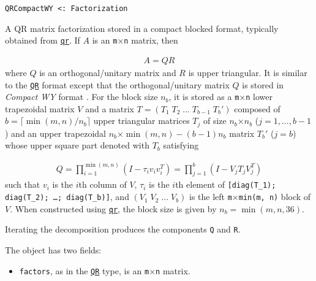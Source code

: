 \begin{adjustwidth}{2em}{0pt}


\begin{verbatim}
QRCompactWY <: Factorization
\end{verbatim}

A QR matrix factorization stored in a compact blocked format, typically obtained from \hyperlink{4122539696772350360}{\texttt{qr}}. If \(A\) is an \texttt{m}×\texttt{n} matrix, then

\begin{equation*}
\begin{split}A = Q R\end{split}\end{equation*}
where \(Q\) is an orthogonal/unitary matrix and \(R\) is upper triangular. It is similar to the \hyperlink{16913872014958777367}{\texttt{QR}} format except that the orthogonal/unitary matrix \(Q\) is stored in \emph{Compact WY} format \footnotemark[1].  For the block size \(n_b\), it is stored as a \texttt{m}×\texttt{n} lower trapezoidal matrix \(V\) and a matrix \(T = (T_1 \; T_2 \; ... \; T_{b-1} \; T_b')\) composed of \(b = \lceil \min(m,n) / n_b \rceil\) upper triangular matrices \(T_j\) of size \(n_b\)×\(n_b\) (\(j = 1, ..., b-1\)) and an upper trapezoidal \(n_b\)×\(\min(m,n) - (b-1) n_b\) matrix \(T_b'\) (\(j=b\)) whose upper square part denoted with \(T_b\) satisfying

\begin{equation*}
\begin{split}Q = \prod_{i=1}^{\min(m,n)} (I - \tau_i v_i v_i^T)
= \prod_{j=1}^{b} (I - V_j T_j V_j^T)\end{split}\end{equation*}
such that \(v_i\) is the \(i\)th column of \(V\), \(\tau_i\) is the \(i\)th element of \texttt{[diag(T\_1); diag(T\_2); …; diag(T\_b)]}, and \((V_1 \; V_2 \; ... \; V_b)\) is the left \texttt{m}×\texttt{min(m, n)} block of \(V\).  When constructed using \hyperlink{4122539696772350360}{\texttt{qr}}, the block size is given by \(n_b = \min(m, n, 36)\).

Iterating the decomposition produces the components \texttt{Q} and \texttt{R}.

The object has two fields:

\begin{itemize}
\item \texttt{factors}, as in the \hyperlink{16913872014958777367}{\texttt{QR}} type, is an \texttt{m}×\texttt{n} matrix.


\end{itemize}
\end{adjustwidth}
